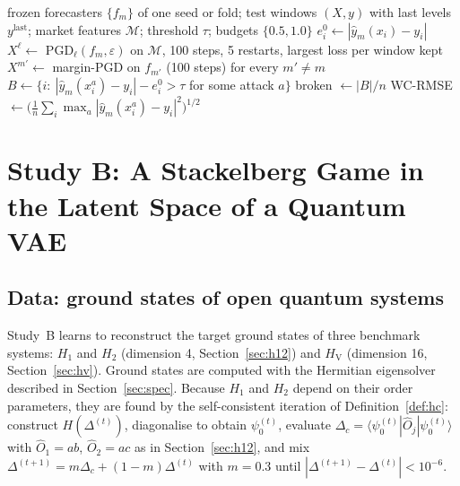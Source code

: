 \documentclass[conference]{IEEEtran}
\newcommand{\HV}{H_{\mathrm{V}}}
\begin{document}
\begin{algorithm}[t]
\caption{Worst-case test-time response (Study~A, regression)}\label{alg:evalR}
\small
\begin{algorithmic}[1]
\Require frozen forecasters $\{f_m\}$ of one seed or fold; test windows $(X,y)$ with last levels $y^{\mathrm{last}}$; market features $\mathcal M$; threshold $\tau$; budgets $\{0.5,1.0\}$
  \State $e^0_i\gets|\hat y_m(x_i)-y_i|$ 
      \State $X^{\ell}\gets$ PGD$_\ell(f_m,\varepsilon)$ on $\mathcal M$, 100 steps, 5 restarts, largest loss per window kept
    \EndFor
    \State $X^{m'}\gets$ margin-PGD on $f_{m'}$ (100 steps) for every $m'\ne m$ 
    \State $B\gets\{i:\ |\hat y_m(x^a_i)-y_i|-e^0_i>\tau$ for some attack $a\}$
    \State broken $\gets|B|/n$
    \State WC-RMSE $\gets\big(\tfrac1n\sum_i\max_a|\hat y_m(x^a_i)-y_i|^2\big)^{1/2}$
  \EndFor
\EndFor
\end{algorithmic}
\end{algorithm}

\section{Study B: A Stackelberg Game in the Latent Space of a Quantum VAE}\label{sec:studyB}
\subsection{Data: ground states of open quantum systems}
Study~B learns to reconstruct the target ground states of three benchmark systems: $H_1$ and $H_2$ (dimension 4, Section~\ref{sec:h12}) and $\HV$ (dimension 16, Section~\ref{sec:hv}). Ground states are computed with the Hermitian eigensolver described in Section~\ref{sec:spec}. Because $H_1$ and $H_2$ depend on their order parameters, they are found by the self-consistent iteration of Definition~\ref{def:hc}: construct $H(\Delta^{(t)})$, diagonalise to obtain $\psi^{(t)}_0$, evaluate $\Delta_c=\langle\psi^{(t)}_0|\hat O_j|\psi^{(t)}_0\rangle$ with $\hat O_1=ab$, $\hat O_2=ac$ as in Section~\ref{sec:h12}, and mix $\Delta^{(t+1)}=m\Delta_c+(1-m)\Delta^{(t)}$ with $m=0.3$ until $|\Delta^{(t+1)}-\Delta^{(t)}|<10^{-6}$.
\end{document}
